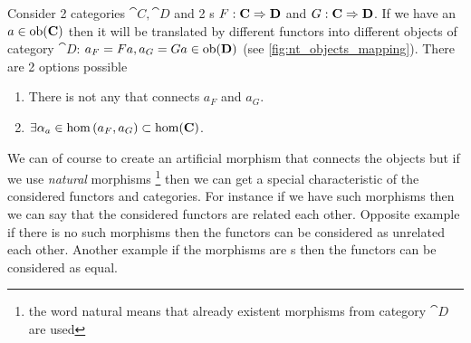 Consider 2 categories $\cat{C}, \cat{D}$ and 2
s $F: \mathbf{C} \Rightarrow \mathbf{D}$ and $G:
\mathbf{C} \Rightarrow \mathbf{D}$. If we have an  $a \in \mathrm{ob}(\mathbf{C})$ then
it will be translated by different functors into different objects of
category $\cat{D}$: $a_F = F a, a_G = G a \in \mathrm{ob}(\mathbf{D})$ (see
\cref{fig:nt_objects_mapping}). There are 2 options possible
\begin{enumerate}
\item There is not  any  that connects $a_F$
  and $a_G$.
\item $\exists \alpha_a \in \hom\left(a_F, a_G\right) \subset
  \mathrm{hom}(\mathbf{C})$. 
\end{enumerate}
We can of course to create an artificial morphism that connects the
objects but if we use \textit{natural} morphisms 
\footnote{the word natural means that already existent morphisms from
  category $\cat{D}$ are used}
then we can get a
special characteristic of the considered functors and categories. For
instance if we have such morphisms then we can say that the
considered functors are related each other. Opposite example if there
is no such morphisms then the functors can be considered as unrelated
each other. Another example if the
morphisms are s then the functors can be
considered as equal.

